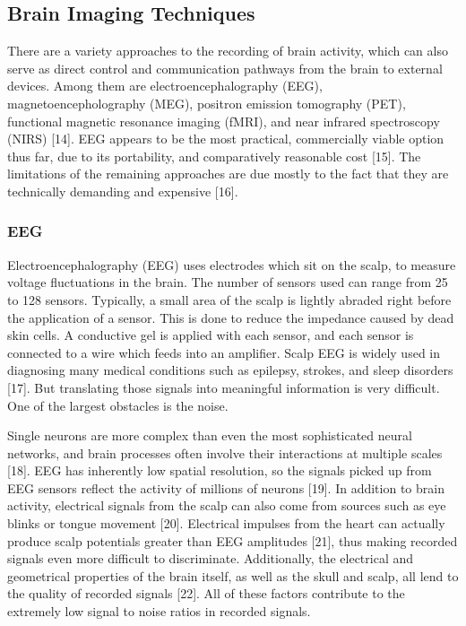 \documentclass[12pt,titlepage]{article}
\begin{document}
\subsection{Brain Imaging Techniques}

There are a variety approaches to the recording of brain activity, which can also serve as direct control 
and communication pathways from the brain to external devices.  Among them are 
electroencephalography (EEG), magnetoencepholography (MEG), positron emission tomography 
(PET), functional magnetic resonance imaging (fMRI), and near infrared spectroscopy (NIRS) [14].  EEG 
appears to be the most practical, commercially viable option thus far, due to its portability, and 
comparatively reasonable cost [15].  The limitations of the remaining approaches are due mostly to the fact 
that they are technically demanding and expensive [16].

\subsubsection{EEG}

Electroencephalography (EEG) uses electrodes which sit on the scalp, to measure voltage fluctuations 
in the brain.  The number of sensors used can range from 25 to 128 sensors.  Typically, a small area of 
the scalp is lightly abraded right before the application of a sensor.  This is done to reduce the 
impedance caused by dead skin cells.  A conductive gel is applied with each sensor, and each sensor is 
connected to a wire which feeds into an amplifier.  Scalp EEG is widely used in diagnosing many 
medical conditions such as epilepsy, strokes, and sleep disorders [17].  But translating those signals into 
meaningful information is very difficult.  One of the largest obstacles is the noise.

Single neurons are more complex than even the most sophisticated neural networks, and brain 
processes often involve their interactions at multiple scales [18].   EEG has inherently low spatial 
resolution, so the signals picked up from EEG  sensors reflect the activity of millions of neurons [19].  In 
addition to brain activity, electrical signals from the scalp can also come from sources such as eye 
blinks or tongue movement [20].  Electrical impulses from the heart can actually produce scalp potentials 
greater than EEG amplitudes [21], thus making recorded signals even more difficult to discriminate. 
Additionally, the electrical and geometrical properties of the brain itself, as well as the skull and scalp, 
all lend to the quality of recorded signals [22].  All of these factors contribute to the extremely low signal 
to noise ratios in recorded signals.
\end{document}
